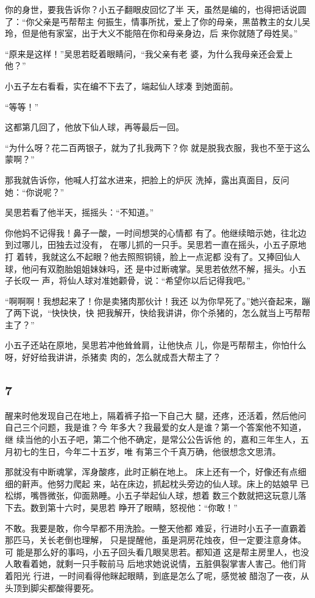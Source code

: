 你的身世，要我告诉你？小五子翻眼皮回忆了半
天，虽然是编的，也得把话说圆了：“你父亲是丐帮帮主
何振生，情事所扰，爱上了你的母亲，黑苗教主的女儿吴
玲，但是他有家室，出于大义不能陪在你和母亲身边，后
来你就随了母姓吴。”

“原来是这样！”吴思若眨着眼睛问，“我父亲有老
婆，为什么我母亲还会爱上他？”

小五子左右看看，实在编不下去了，端起仙人球凑
到她面前。

“等等！”

这都第几回了，他放下仙人球，再等最后一回。

“为什么呀？花二百两银子，就为了扎我两下？你
就是脱我衣服，我也不至于这么蒙啊？”

那我就告诉你，他喊人打盆水进来，把脸上的炉灰
洗掉，露出真面目，反问她：“你说呢？”

吴思若看了他半天，摇摇头：“不知道。”

你他妈不记得我！鼻子一酸，一时间想哭的心情都
有了。他继续暗示她，往北边到过哪儿，田独去过没有，
在哪儿抓的一只手。吴思若一直在摇头，小五子原地打
着转，我就这么不起眼？他去照照铜镜，脸上一点泥都
没有了。又捧回仙人球，他问有双胞胎姐姐妹妹吗，还
是中过断魂掌。吴思若依然不解，摇头。小五子长叹一
声，将仙人球对准她颧骨，说：“希望你以后记得我吧。”

“啊啊啊！我想起来了！你是卖猪肉那伙计！我还
以为你早死了。”她兴奋起来，蹦了两下说，“快快快，快
把我解开，快给我讲讲，你个杀猪的，怎么就当上丐帮帮
主了？”

小五子还站在原地，吴思若冲他耸耸肩，让他快点
儿，你是丐帮帮主，你怕什么呀，好好给我讲讲，杀猪卖
肉的，怎么就成吾大帮主了？
\newline

{\centering\subsection{7}}

醒来时他发现自己在地上，隔着裤子掐一下自己大
腿，还疼，还活着，然后他问自己三个问题，我是谁？今
年多大？我最爱的女人是谁？第一个答案他不知道，继
续当他的小五子吧，第二个他不确定，是常公公告诉他
的，嘉和三年生人，五月初七的生日，今年二十五岁，唯
有第三个千真万确，他很想念文思清。

那就没有中断魂掌，浑身酸疼，此时正躺在地上。
床上还有一个，好像还有点细细的鼾声。他努力爬起
来，站在床边，抓起枕头旁边的仙人球。床上的姑娘早
已松绑，嘴唇微张，仰面熟睡。小五子举起仙人球，想着
数三个数就把这玩意儿落下去。数到第十六时，昊思若
睁开了眼睛，怒视他：“你敢！”

不敢。我要是敢，你今早都不用洗脸。一整天他都
难妥，行进时小五子一直霸着那匹马，关长老倒也理解，
只是提醒他，虽是洞房花烛夜，但一定要注意身体。可
能是那么好的事吗，小五子回头看几眼吴思若。都知道
这是帮主房里人，也没人敢看着她，就剩一只手鞍前马
后地求她说说情，五脏俱裂掌害人害己。他们背着阳光
行进，一时间看得他眯起眼睛，到底是怎么了呢，感觉被
醋泡了一夜，从头顶到脚尖都酸得要死。

